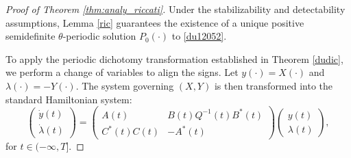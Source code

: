 \documentclass{IEEEtran}
\begin{document}
	\begin{proof}[Proof of Theorem \ref{thm:analy_riccati}]
		Under the stabilizability and detectability assumptions, Lemma \ref{ric} guarantees the existence of a unique positive semidefinite $\theta$-periodic solution $P_0(\cdot)$ to \eqref{du12052}.
		
		To apply the periodic dichotomy transformation established in Theorem \ref{dudic}, we perform a change of variables to align the signs. Let $y(\cdot) = X(\cdot)$ and $\lambda(\cdot) = -Y(\cdot)$. The system governing $(X,Y)$ is then transformed into the standard Hamiltonian system:
		\begin{equation*}
			\begin{pmatrix}
				\dot{y}(t)\\ \dot{\lambda}(t)
			\end{pmatrix}=
			\begin{pmatrix}
				A(t) & B(t)Q^{-1}(t)B^*(t)\\
				C^*(t)C(t)&-A^*(t)
			\end{pmatrix}
			\begin{pmatrix}
				y(t)\\ \lambda (t)
			\end{pmatrix},  
		\end{equation*}for $t\in (-\infty,T]$.
		

\end{proof}
\end{document}
